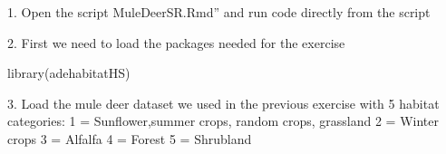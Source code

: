 \documentclass[
  letterpaper,
]{book}
\newenvironment{Shaded}{\begin{snugshade}}{\end{snugshade}}
\newcommand{\AttributeTok}[1]{\textcolor[rgb]{0.40,0.45,0.13}{#1}}
\newcommand{\CommentTok}[1]{\textcolor[rgb]{0.37,0.37,0.37}{#1}}
\newcommand{\DecValTok}[1]{\textcolor[rgb]{0.68,0.00,0.00}{#1}}
\newcommand{\FunctionTok}[1]{\textcolor[rgb]{0.28,0.35,0.67}{#1}}
\newcommand{\NormalTok}[1]{\textcolor[rgb]{0.00,0.23,0.31}{#1}}
\newcommand{\OtherTok}[1]{\textcolor[rgb]{0.00,0.23,0.31}{#1}}
\newcommand{\SpecialCharTok}[1]{\textcolor[rgb]{0.37,0.37,0.37}{#1}}
\newcommand{\StringTok}[1]{\textcolor[rgb]{0.13,0.47,0.30}{#1}}
\begin{document}
1. Open the script MuleDeerSR.Rmd'' and run code directly from the
script

2. First we need to load the packages needed for the exercise

\begin{Shaded}
\begin{Highlighting}[]
\FunctionTok{library}\NormalTok{(adehabitatHS)}
\end{Highlighting}
\end{Shaded}

3. Load the mule deer dataset we used in the previous exercise with 5
habitat categories: 1 = Sunflower,summer crops, random crops, grassland
2 = Winter crops 3 = Alfalfa 4 = Forest 5 = Shrubland

\begin{Shaded}
\end{Shaded}
\end{document}
